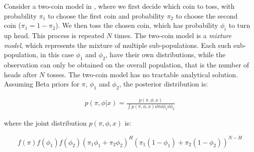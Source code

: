 Consider a two-coin model in , where we first decide
which coin to toss, with probability $\pi_1$ to choose the first coin and
probability $\pi_2$ to choose the second coin ($\pi_1 = 1 - \pi_2$). 
We then toss the chosen coin, which has probability $\phi_i$ to turn up head. 
This process is repeated $N$ times. The two-coin model is
a {\em mixture model}, which represents the
mixture of multiple sub-populations. Each such sub-population, in this case
$\phi_1$ and $\phi_2$, have their own distributions, 
while the observation can only be obtained on the overall population, that is
the number of heads after $N$ tosses. 
The two-coin model has no tractable analytical solution. 
Assuming Beta priors for $\pi$, $\phi_{1}$ and $\phi_{2}$, 
the posterior distribution is:

{
\small
\begin{align*}
	&p(\pi, \phi | x) = \frac{p(\pi, \phi, x)}{\int p(\pi, \phi, x) \dd \pi \dd
\phi_1 \dd \phi_2}
\end{align*}
}

\noindent
where the joint distribution $p(\pi, \phi, x)$ is:

{\small
\begin{align*}
	&f(\pi)f(\phi_1)f(\phi_2)(\pi_1 \phi_1 + \pi_2 \phi_2)^H (\pi_1
	(1-\phi_1) + \pi_2 (1- \phi_2))^{N-H} \\
\end{align*}
}



